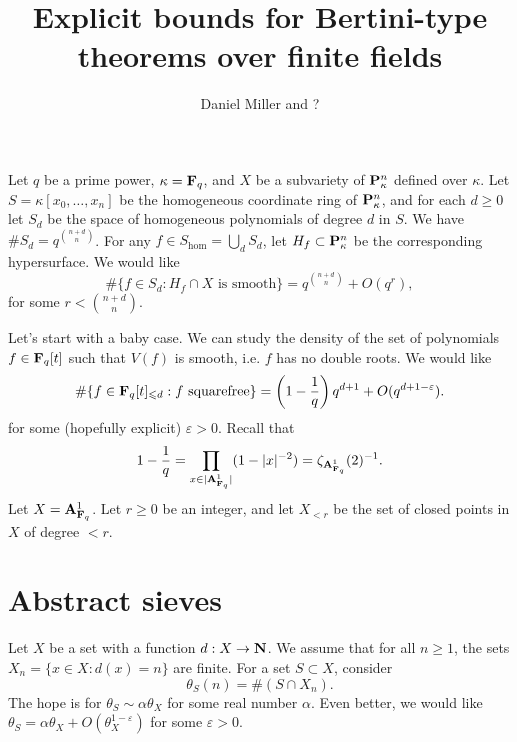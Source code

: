 \documentclass{article}
\title{Explicit bounds for Bertini-type theorems over finite fields}
\author{Daniel Miller and ?}
\begin{document}
\maketitle





Let $q$ be a prime power, $\kappa=\mathbf{F}_q$, and $X$ be a subvariety of 
$\mathbf{P}_\kappa^n$ defined over $\kappa$. Let $S=\kappa[x_0,\dots,x_n]$ be the 
homogeneous coordinate ring of $\mathbf{P}_\kappa^n$, and for each $d\geq 0$ let 
$S_d$ be the space of homogeneous polynomials of degree $d$ in $S$. We have 
$\# S_d = q^{\binom{n+d}{n}}$. For any $f\in S_{\hom}=\bigcup_d S_d$, let 
$H_f\subset \mathbf{P}_\kappa^n$ be the corresponding hypersurface. We would like 
\[
  \#\{f\in S_d:H_f\cap X\text{ is smooth}\} = q^{\binom{n+d}{n}} + O(q^r) ,
\]
for some $r<\binom{n+d}{n}$. 

Let's start with a baby case. We can study the density of the set of 
polynomials $f\in \mathbf{F}_q[t]$ such that $V(f)$ is smooth, i.e. $f$ has no 
double roots. We would like 
\[
  \#\{f\in \mathbf{F}_q[t]_{\leqslant d} : f\text{ squarefree}\} = \left(1-\frac 1 q\right) q^{d+1} + O(q^{d+1-\varepsilon}) .
\]
for some (hopefully explicit) $\varepsilon>0$. Recall that 
\[
  1-\frac 1 q = \prod_{x\in |\mathbf{A}_{\mathbf{F}_q}^1|} (1-|x|^{-2}) = \zeta_{\mathbf{A}_{\mathbf{F}_q}^1}(2)^{-1} .
\]
Let $X=\mathbf{A}_{\mathbf{F}_q}^1$. Let $r\geq 0$ be an integer, and let $X_{<r}$ be the 
set of closed points in $X$ of degree $<r$. 





\section{Abstract sieves}

Let $X$ be a set with a function $d:X\to \mathbf{N}$. We assume that for all 
$n\geq 1$, the sets $X_n=\{x\in X:d(x) = n\}$ are finite. For a set 
$S\subset X$, consider 
\[
  \theta_S(n) = \#(S\cap X_n). 
\]
The hope is for $\theta_S\sim \alpha\theta_X$ for some real number $\alpha$. 
Even better, we would like $\theta_S=\alpha\theta_X+O(\theta_X^{1-\varepsilon})$ 
for some $\varepsilon>0$. 
\end{document}
